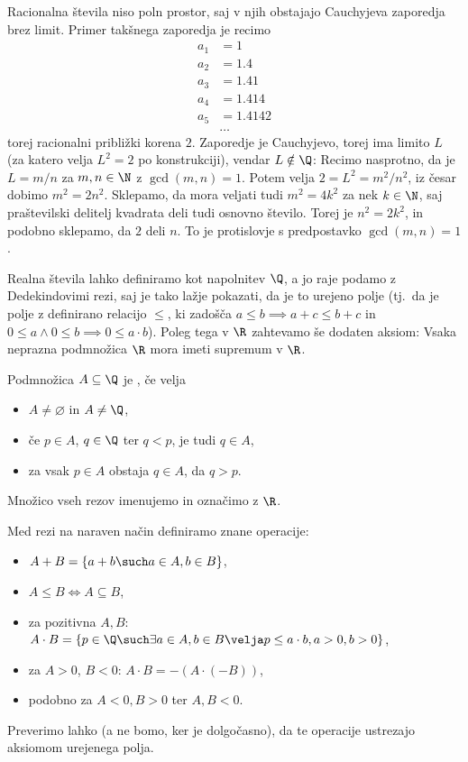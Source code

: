 

Racionalna števila niso poln prostor, saj v njih obstajajo Cauchyjeva zaporedja
brez limit.
Primer takšnega zaporedja je recimo
\begin{align*}
  a_1 &= 1 \\
  a_2 &= 1.4 \\
  a_3 &= 1.41 \\
  a_4 &= 1.414 \\
  a_5 &= 1.4142 \\
  & \ldots
\end{align*}
torej racionalni približki korena $2$.
Zaporedje je Cauchyjevo, torej ima limito $L$ (za katero velja $L^2 = 2$ po
konstrukciji), vendar $L \notin \Q$:
Recimo nasprotno, da je $L = m / n$ za $m,n \in \N$ z $\gcd(m,n) = 1$.
Potem velja $2 = L^2 = m^2 / n^2$, iz česar dobimo $m^2 = 2 n^2$.
Sklepamo, da mora veljati tudi $m^2 = 4 k^2$ za nek $k \in \N$, saj praštevilski
delitelj kvadrata deli tudi osnovno število.
Torej je $n^2 = 2 k^2$, in podobno sklepamo, da $2$ deli $n$.
To je protislovje s predpostavko $\gcd(m,n) = 1$.

Realna števila lahko definiramo kot napolnitev $\Q$, a jo raje podamo z
Dedekindovimi rezi, saj je tako lažje pokazati, da je to urejeno polje (tj.~da
je polje z definirano relacijo $\le$, ki zadošča $a \le b \implies a + c \le b +
c$ in $0 \le a \land 0 \le b \implies 0 \le a \cdot b$).
Poleg tega v $\R$ zahtevamo še dodaten aksiom:
Vsaka neprazna podmnožica $\R$ mora imeti supremum v $\R$.

\begin{definicija}
  Podmnožica $A \subseteq \Q$ je , če velja
  \begin{itemize}
  \item $A \ne \varnothing$ in $A \ne \Q$,
  \item če $p \in A$, $q \in \Q$ ter $q < p$, je tudi $q \in A$,
  \item za vsak $p \in A$ obstaja $q \in A$, da $q > p$.
  \end{itemize}
  Množico vseh rezov imenujemo  in označimo z $\R$.
\end{definicija}

\noindent
Med rezi na naraven način definiramo znane operacije:
\begin{itemize}
\item $A + B = \{ a + b \such a \in A, b \in B \}$,
\item $A \le B \iff A \subseteq B$,
\item za pozitivna $A, B$: $A \cdot B = \{ p \in \Q \such \exists a \in A, b \in
  B \velja p \le a \cdot b, a > 0, b > 0\}$,
\item za $A > 0$, $B < 0$: $A \cdot B = -(A \cdot (-B))$,
\item podobno za $A < 0, B > 0$ ter $A, B < 0$.
\end{itemize}
Preverimo lahko (a ne bomo, ker je dolgočasno), da te operacije ustrezajo
aksiomom urejenega polja.


